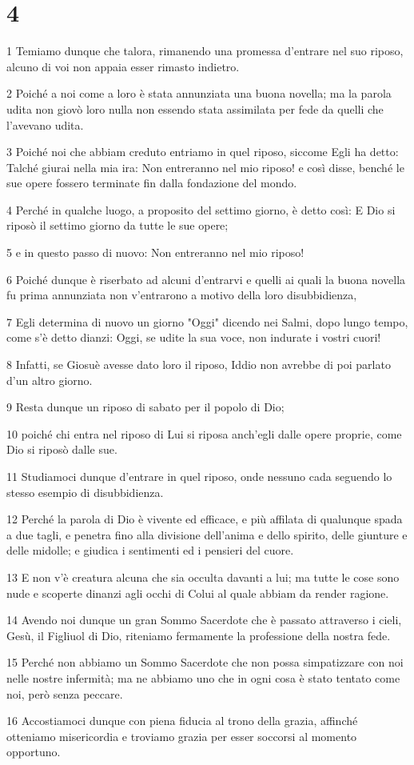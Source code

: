 \chapter{4}

\par 1 Temiamo dunque che talora, rimanendo una promessa d'entrare nel suo riposo, alcuno di voi non appaia esser rimasto indietro.
\par 2 Poiché a noi come a loro è stata annunziata una buona novella; ma la parola udita non giovò loro nulla non essendo stata assimilata per fede da quelli che l'avevano udita.
\par 3 Poiché noi che abbiam creduto entriamo in quel riposo, siccome Egli ha detto: Talché giurai nella mia ira: Non entreranno nel mio riposo! e così disse, benché le sue opere fossero terminate fin dalla fondazione del mondo.
\par 4 Perché in qualche luogo, a proposito del settimo giorno, è detto così: E Dio si riposò il settimo giorno da tutte le sue opere;
\par 5 e in questo passo di nuovo: Non entreranno nel mio riposo!
\par 6 Poiché dunque è riserbato ad alcuni d'entrarvi e quelli ai quali la buona novella fu prima annunziata non v'entrarono a motivo della loro disubbidienza,
\par 7 Egli determina di nuovo un giorno "Oggi" dicendo nei Salmi, dopo lungo tempo, come s'è detto dianzi: Oggi, se udite la sua voce, non indurate i vostri cuori!
\par 8 Infatti, se Giosuè avesse dato loro il riposo, Iddio non avrebbe di poi parlato d'un altro giorno.
\par 9 Resta dunque un riposo di sabato per il popolo di Dio;
\par 10 poiché chi entra nel riposo di Lui si riposa anch'egli dalle opere proprie, come Dio si riposò dalle sue.
\par 11 Studiamoci dunque d'entrare in quel riposo, onde nessuno cada seguendo lo stesso esempio di disubbidienza.
\par 12 Perché la parola di Dio è vivente ed efficace, e più affilata di qualunque spada a due tagli, e penetra fino alla divisione dell'anima e dello spirito, delle giunture e delle midolle; e giudica i sentimenti ed i pensieri del cuore.
\par 13 E non v'è creatura alcuna che sia occulta davanti a lui; ma tutte le cose sono nude e scoperte dinanzi agli occhi di Colui al quale abbiam da render ragione.
\par 14 Avendo noi dunque un gran Sommo Sacerdote che è passato attraverso i cieli, Gesù, il Figliuol di Dio, riteniamo fermamente la professione della nostra fede.
\par 15 Perché non abbiamo un Sommo Sacerdote che non possa simpatizzare con noi nelle nostre infermità; ma ne abbiamo uno che in ogni cosa è stato tentato come noi, però senza peccare.
\par 16 Accostiamoci dunque con piena fiducia al trono della grazia, affinché otteniamo misericordia e troviamo grazia per esser soccorsi al momento opportuno.

